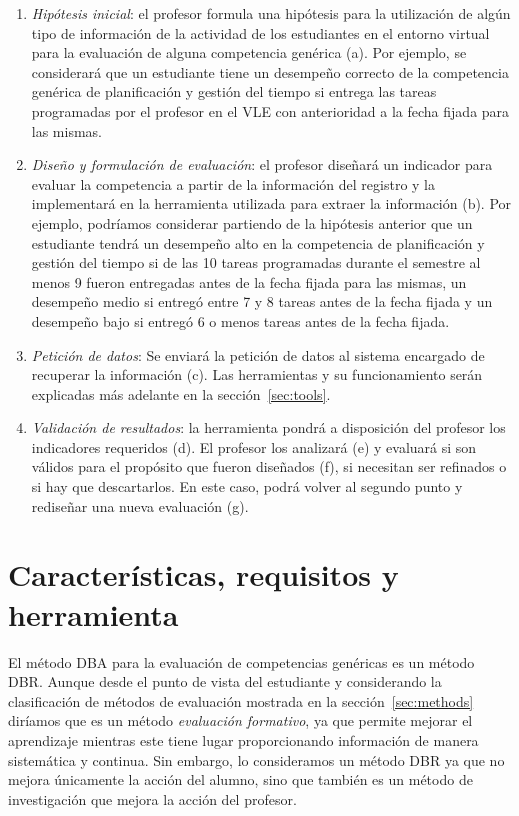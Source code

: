 \begin{enumerate}
\item \emph{Hipótesis inicial}: el profesor formula una hipótesis para la utilización de algún tipo de información de la actividad de los estudiantes en el entorno virtual para la evaluación de alguna competencia genérica (a). Por ejemplo, se considerará que un estudiante tiene un desempeño correcto de la competencia genérica de planificación y gestión del tiempo si entrega las tareas programadas por el profesor en el VLE con anterioridad a la fecha fijada para las mismas.
\item \emph{Diseño y formulación de evaluación}: el profesor diseñará un indicador para evaluar la competencia a partir de la información del registro y la implementará en la herramienta utilizada para extraer la información (b). Por ejemplo, podríamos considerar partiendo de la hipótesis anterior que un estudiante tendrá un desempeño alto en la competencia de planificación y gestión del tiempo si de las 10 tareas programadas durante el semestre al menos 9 fueron entregadas antes de la fecha fijada para las mismas, un desempeño medio si entregó entre 7 y 8 tareas antes de la fecha fijada y un desempeño bajo si entregó 6 o menos tareas antes de la fecha fijada.
\item \emph{Petición de datos}: Se enviará la petición de datos al sistema encargado de recuperar la información (c). Las herramientas y su funcionamiento serán explicadas más adelante en la sección~\ref{sec:tools}.
\item \emph{Validación de resultados}: la herramienta pondrá a disposición del profesor los indicadores requeridos (d). El profesor los analizará (e) y evaluará si son válidos para el propósito que fueron diseñados (f), si necesitan ser refinados o si hay que descartarlos. En este caso, podrá volver al segundo punto y rediseñar una nueva evaluación (g).
\end{enumerate}

\section{Características, requisitos y herramienta}

El método DBA para la evaluación de competencias genéricas es un método DBR. Aunque desde el punto de vista del estudiante y considerando la clasificación de métodos de evaluación mostrada en la sección~\ref{sec:methods} diríamos que es un método \emph{evaluación formativo}, ya que permite mejorar el aprendizaje mientras este tiene lugar proporcionando información de manera sistemática y continua. Sin embargo, lo consideramos un método DBR ya que no mejora únicamente la acción del alumno, sino que también es un método de investigación que mejora la acción del profesor.

